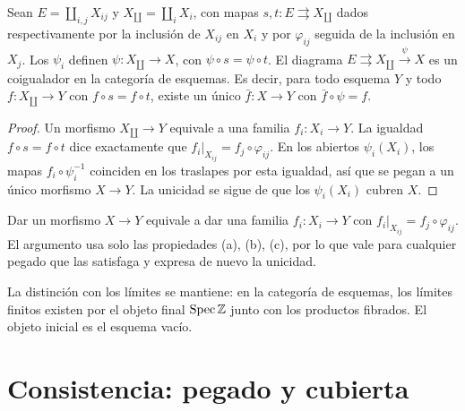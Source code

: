 \begin{prop}
\label{prop:s07-pegado-coigualador}
Sean $E=\coprod_{i,j}X_{ij}$ y $X_\amalg=\coprod_iX_i$, con mapas $s,t\colon E\rightrightarrows X_\amalg$ dados respectivamente por la inclusión de $X_{ij}$ en $X_i$ y por $\varphi_{ij}$ seguida de la inclusión en $X_j$. Los $\psi_i$ definen $\psi\colon X_\amalg\to X$, con $\psi\circ s=\psi\circ t$. El diagrama $E\rightrightarrows X_\amalg\xrightarrow{\psi}X$ es un coigualador en la categoría de esquemas. Es decir, para todo esquema $Y$ y todo $f\colon X_\amalg\to Y$ con $f\circ s=f\circ t$, existe un único $\bar f\colon X\to Y$ con $\bar f\circ\psi=f$.
\end{prop}
\begin{proof}
Un morfismo $X_\amalg\to Y$ equivale a una familia $f_i\colon X_i\to Y$. La igualdad $f\circ s=f\circ t$ dice exactamente que $f_i|_{X_{ij}}=f_j\circ\varphi_{ij}$. En los abiertos $\psi_i(X_i)$, los mapas $f_i\circ\psi_i^{-1}$ coinciden en los traslapes por esta igualdad, así que se pegan a un único morfismo $X\to Y$. La unicidad se sigue de que los $\psi_i(X_i)$ cubren $X$.
\end{proof}

\begin{obs}
\label{obs:s07-dar-morfismo-x-equivale-dar}
Dar un morfismo $X\to Y$ equivale a dar una familia $f_i\colon X_i\to Y$ con $f_i|_{X_{ij}}=f_j\circ\varphi_{ij}$. El argumento usa solo las propiedades (a), (b), (c), por lo que vale para cualquier pegado que las satisfaga y expresa de nuevo la unicidad.
\end{obs}

La distinción con los límites se mantiene: en la categoría de esquemas, los límites finitos existen por el objeto final $\operatorname{Spec}\mathbb Z$ junto con los productos fibrados. El objeto inicial es el esquema vacío.

\section{Consistencia: pegado y cubierta}

